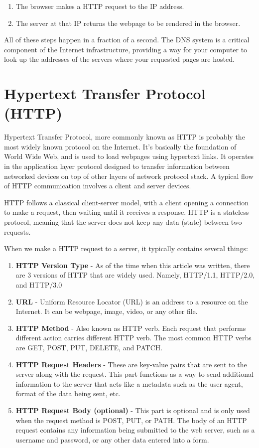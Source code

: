 \documentclass[12pt,titlepage]{article}
\begin{document}
\begin{enumerate}
    \item {
        The browser makes a HTTP request to the IP address.
        }
    \item {
        The server at that IP returns the webpage to be rendered in the browser.
    }
\end{enumerate}

All of these steps happen in a fraction of a second. The DNS system is a critical component of the Internet infrastructure, providing a way
for your computer to look up the addresses of the servers where your requested pages are hosted.

\section{Hypertext Transfer Protocol (HTTP)}

Hypertext Transfer Protocol, more commonly known as HTTP is probably the most widely known protocol on the Internet. It's
basically the foundation of World Wide Web, and is used to load webpages using hypertext links. It operates in the application layer protocol
designed to transfer information between networked devices on top of other layers of network protocol stack.
A typical flow of HTTP communication involves a client and server devices.

HTTP follows a classical client-server model, with a client opening a connection to make a request,
then waiting until it receives a response. HTTP is a stateless protocol, meaning that the server does not
keep any data (state) between two requests.

When we make a HTTP request to a server, it typically contains several things:
\begin{enumerate}
    \item {
        \textbf{HTTP Version Type} - As of the time when this article was written, there are 3 versions of HTTP that are widely used.
        Namely, HTTP/1.1, HTTP/2.0, and HTTP/3.0
    }
    \item {
        \textbf{URL} - Uniform Resource Locator (URL) is an address to a resource on the Internet.
        It can be  webpage, image, video, or any other file.
    }
    \item {
        \textbf{HTTP Method} - Also known as HTTP verb. Each request that performs different action
        carries different HTTP verb. The most common HTTP verbs are GET, POST, PUT, DELETE, and PATCH.
    }
    \item {
        \textbf{HTTP Request Headers} - These are key-value pairs that are sent to the server along with the request.
        This part functions as a way to send additional information to the server that acts like a metadata such as the user agent,
        format of the data being sent, etc.
    }
    \item {
        \textbf{HTTP Request Body (optional)} - This part is optional and is only used when the request method is POST, PUT, or PATH.
        The body of an HTTP request contains any information being submitted to the web server, such as a username and password, or any other data entered into a form.
    }
\end{enumerate}
\end{document}
